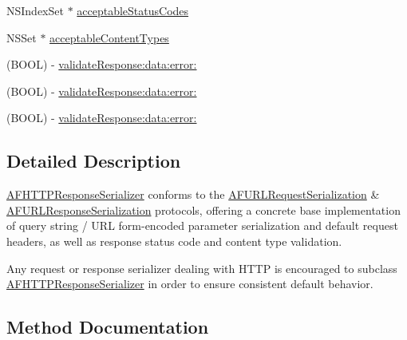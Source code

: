  

 \begin{DoxyCompactItemize}
\item 
N\+S\+Index\+Set $\ast$ \mbox{\hyperlink{interface_a_f_h_t_t_p_response_serializer_a522abf2e1ac618683d60e1cae355ee10}{acceptable\+Status\+Codes}}
\item 
N\+S\+Set $\ast$ \mbox{\hyperlink{interface_a_f_h_t_t_p_response_serializer_a198b7c998b7c05d4f8b14ee248669987}{acceptable\+Content\+Types}}
\item 
(B\+O\+OL) -\/ \mbox{\hyperlink{interface_a_f_h_t_t_p_response_serializer_a0790206d439eebff481fda1e45a632ea}{validate\+Response\+:data\+:error\+:}}
\item 
(B\+O\+OL) -\/ \mbox{\hyperlink{interface_a_f_h_t_t_p_response_serializer_a0790206d439eebff481fda1e45a632ea}{validate\+Response\+:data\+:error\+:}}
\item 
(B\+O\+OL) -\/ \mbox{\hyperlink{interface_a_f_h_t_t_p_response_serializer_a0790206d439eebff481fda1e45a632ea}{validate\+Response\+:data\+:error\+:}}
\end{DoxyCompactItemize}


\subsection{Detailed Description}
{\ttfamily \mbox{\hyperlink{interface_a_f_h_t_t_p_response_serializer}{A\+F\+H\+T\+T\+P\+Response\+Serializer}}} conforms to the {\ttfamily \mbox{\hyperlink{class_a_f_u_r_l_request_serialization-p}{A\+F\+U\+R\+L\+Request\+Serialization}}} \& {\ttfamily \mbox{\hyperlink{class_a_f_u_r_l_response_serialization-p}{A\+F\+U\+R\+L\+Response\+Serialization}}} protocols, offering a concrete base implementation of query string / U\+RL form-\/encoded parameter serialization and default request headers, as well as response status code and content type validation.

Any request or response serializer dealing with H\+T\+TP is encouraged to subclass {\ttfamily \mbox{\hyperlink{interface_a_f_h_t_t_p_response_serializer}{A\+F\+H\+T\+T\+P\+Response\+Serializer}}} in order to ensure consistent default behavior. 

\subsection{Method Documentation}
\mbox{\label{interface_a_f_h_t_t_p_response_serializer_a9aee0c560f22d56f985170b0cdc0617f}} 
